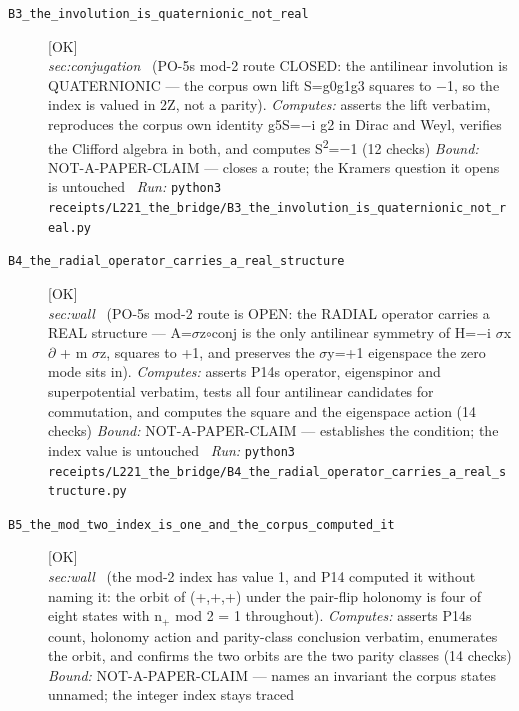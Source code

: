 \begin{description}
\item[\label{rcpt:B3_the_involution_is_quaternionic_not_real}\texttt{B3\_the\_involution\_is\_quaternionic\_not\_real}]\hfill\textsf{[OK]}\\
\textit{sec:conjugation} \ (PO-5s mod-2 route CLOSED: the antilinear involution is QUATERNIONIC --- the corpus own lift S=g0g1g3 squares to \ensuremath{-}1, so the index is valued in 2Z, not a parity). 
\emph{Computes:} asserts the lift verbatim, reproduces the corpus own identity g5S=\ensuremath{-}i g2 in Dirac and Weyl, verifies the Clifford algebra in both, and computes S\textsuperscript{2}=\ensuremath{-}1 (12 checks)
 \emph{Bound:} NOT-A-PAPER-CLAIM --- closes a route; the Kramers question it opens is untouched
\ \emph{Run:} \texttt{python3 receipts/L221\_the\_bridge/B3\_the\_involution\_is\_quaternionic\_not\_real.py}
\item[\label{rcpt:B4_the_radial_operator_carries_a_real_structure}\texttt{B4\_the\_radial\_operator\_carries\_a\_real\_structure}]\hfill\textsf{[OK]}\\
\textit{sec:wall} \ (PO-5s mod-2 route is OPEN: the RADIAL operator carries a REAL structure --- A=\ensuremath{\sigma}z\ensuremath{\circ}conj is the only antilinear symmetry of H=\ensuremath{-}i \ensuremath{\sigma}x \ensuremath{\partial} + m \ensuremath{\sigma}z, squares to +1, and preserves the \ensuremath{\sigma}y=+1 eigenspace the zero mode sits in). 
\emph{Computes:} asserts P14s operator, eigenspinor and superpotential verbatim, tests all four antilinear candidates for commutation, and computes the square and the eigenspace action (14 checks)
 \emph{Bound:} NOT-A-PAPER-CLAIM --- establishes the condition; the index value is untouched
\ \emph{Run:} \texttt{python3 receipts/L221\_the\_bridge/B4\_the\_radial\_operator\_carries\_a\_real\_structure.py}
\item[\label{rcpt:B5_the_mod_two_index_is_one_and_the_corpus_computed_it}\texttt{B5\_the\_mod\_two\_index\_is\_one\_and\_the\_corpus\_computed\_it}]\hfill\textsf{[OK]}\\
\textit{sec:wall} \ (the mod-2 index has value 1, and P14 computed it without naming it: the orbit of (+,+,+) under the pair-flip holonomy is four of eight states with n\ensuremath{_+} mod 2 = 1 throughout). 
\emph{Computes:} asserts P14s count, holonomy action and parity-class conclusion verbatim, enumerates the orbit, and confirms the two orbits are the two parity classes (14 checks)
 \emph{Bound:} NOT-A-PAPER-CLAIM --- names an invariant the corpus states unnamed; the integer index stays traced

\end{description}
